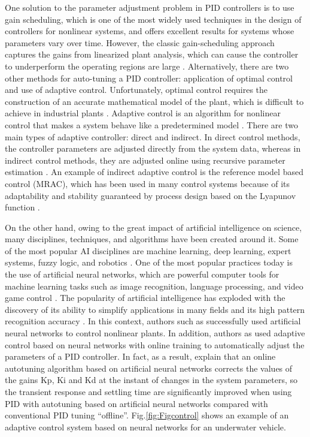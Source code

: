 \documentclass{ieeeaccess}
\begin{document}
One solution to the parameter adjustment problem in PID controllers is to use gain scheduling, which is one of the most widely used techniques in the design of controllers for nonlinear systems, and offers excellent results for systems whose parameters vary over time. However, the classic gain-scheduling approach captures the gains from linearized plant analysis, which can cause the controller to underperform the operating regions are large \cite{chertovskikh_adaptive_2019}. Alternatively, there are two other methods for auto-tuning a PID controller: application of optimal control and use of adaptive control. Unfortunately, optimal control requires the construction of an accurate mathematical model of the plant, which is difficult to achieve in industrial plants \cite{glushchenko_development_2019}. Adaptive control is an algorithm for nonlinear control that makes a system behave like a predetermined model \cite{astrom_pid_1995}. There are two main types of adaptive controller: direct and indirect. In direct control methods, the controller parameters are adjusted directly from the system data, whereas in indirect control methods, they are adjusted online using recursive parameter estimation \cite{astrom_pid_1995}. An example of indirect adaptive control is the reference model based control (MRAC), which has been used in many control systems because of its adaptability and stability guaranteed by process design based on the Lyapunov function \cite{jingzhuo_model_2020}.

On the other hand, owing to the great impact of artificial intelligence on science, many disciplines, techniques, and algorithms have been created around it. Some of the most popular AI disciplines are machine learning, deep learning, expert systems, fuzzy logic, and robotics \cite{zheng_introducing_2021}. One of the most popular practices today is the use of artificial neural networks, which are powerful computer tools for machine learning tasks such as image recognition, language processing, and video game control \cite{hurbans_grokking_2020}. The popularity of artificial intelligence has exploded with the discovery of its ability to simplify applications in many fields and its high pattern recognition accuracy \cite{abiodun_comprehensive_2019}. In this context, authors such as \cite{narendra_identification_1990} successfully used artificial neural networks to control nonlinear plants. In addition, authors as \cite{pirabakaran_pid_2002, hernandez-alvarado_neural_2016, glushchenko_development_2019, bari_artificial_2019} used adaptive control based on neural networks with online training to automatically adjust the parameters of a PID controller. In fact, as a result, \cite{bari_artificial_2019} explain that an online autotuning algorithm based on artificial neural networks corrects the values of the gains Kp, Ki and Kd at the instant of changes in the system parameters, so the transient response and settling time are significantly improved when using PID with autotuning based on artificial neural networks compared with conventional PID tuning “offline”. Fig.\ref{fig:Figcontrol} shows an example of an adaptive control system based on neural networks for an underwater vehicle.
\end{document}
